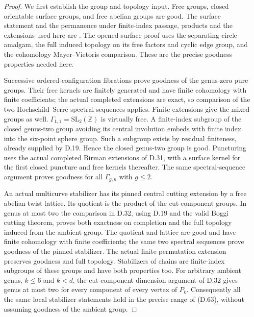 \begin{proof}
We first establish the group and topology input.  Free groups,
closed orientable surface groups, and free abelian groups are good.
The surface statement and the permanence under finite-index
passage, products and the extensions used here are
\cite[Lemmas 3.1--3.3, Proposition 3.4, and Proposition 3.6]{D_GJZ2008}.
The opened surface proof uses the separating-circle amalgam,
the full induced topology on its free factors and cyclic edge
group, and the cohomology Mayer--Vietoris comparison.  These are
the precise goodness properties needed here.

Successive ordered-configuration fibrations prove goodness of
the genus-zero pure groups.  Their free kernels are finitely
generated and have finite cohomology with finite coefficients;
the actual completed extensions are exact, so comparison of the
two Hochschild--Serre spectral sequences applies.  Finite
extensions give the mixed groups as well.
$\Gamma_{1,1}=\mathrm{SL}_2(\mathbb Z)$ is virtually free.
A finite-index subgroup of the closed genus-two group avoiding
its central involution embeds with finite index into the
six-point sphere group.  Such a subgroup exists by residual
finiteness, already supplied by D.19.  Hence the closed genus-two
group is good.  Puncturing uses the actual completed Birman
extensions of D.31, with a surface kernel for the first closed
puncture and free kernels thereafter.  The same spectral-sequence
argument proves goodness for all $\Gamma_{g,n}$ with $g\leq2$.

An actual multicurve stabilizer has its pinned central cutting
extension by a free abelian twist lattice.  Its quotient is the
product of the cut-component groups.  In genus at most two the
comparison in D.32, using D.19 and the valid Boggi cutting theorem,
proves both exactness on completion and the full topology induced
from the ambient group.  The quotient and lattice are good and
have finite cohomology with finite coefficients; the same two
spectral sequences prove goodness of the pinned stabilizer.
The actual finite permutation extension preserves goodness and
full topology.  Stabilizers of chains are finite-index subgroups
of these groups and have both properties too.  For arbitrary
ambient genus, $k\leq6$ and $k<d$, the cut-component dimension
argument of D.32 gives genus at most two for every component of
every vertex of $P_k$.  Consequently all the same local
stabilizer statements hold in the precise range of (D.63),
without assuming goodness of the ambient group.


\end{proof}

